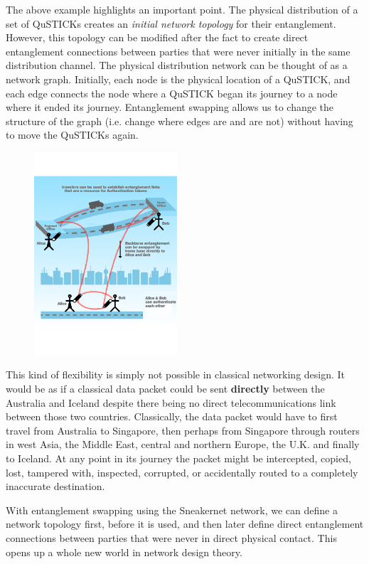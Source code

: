 \documentclass[twocolumn, aps, rmp, amsmath, amssymb, nofootinbib, superscriptaddress, longbibliography, floatfix, table-of-contents, eqsecnum]{revtex4-2}
\begin{document}
The above example highlights an important point. The physical distribution of a set of QuSTICKs creates an \textit{initial network topology} for their entanglement. However, this topology can be modified after the fact to create direct entanglement connections between parties that were never initially in the same distribution channel. The physical distribution network can be thought of as a network graph. Initially, each node is the physical location of a QuSTICK, and each edge connects the node where a QuSTICK began its journey to a node where it ended its journey. Entanglement swapping allows us to change the structure of the graph (i.e. change where edges are and are not) without having to move the QuSTICKs again. 
 
\begin{figure}[htbp!]
	\includegraphics[clip=true, width=0.475\textwidth]{SWAPPING}
	\caption{} \label{fig:SWAPPING}
\end{figure}

This kind of flexibility is simply not possible in classical networking design. It would be as if a classical data packet could be sent \textbf{directly} between the Australia and Iceland despite there being no direct telecommunications link between those two countries. Classically, the data packet would have to first travel from Australia to Singapore, then perhaps from Singapore through routers in west Asia, the Middle East, central and northern Europe, the U.K. and finally to Iceland. At any point in its journey the packet might be intercepted, copied, lost, tampered with, inspected, corrupted, or accidentally routed to a completely inaccurate destination. 

With entanglement swapping using the Sneakernet network, we can define a network topology first, before it is used, and then later define direct entanglement connections between parties that were never in direct physical contact. This opens up a whole new world in network design theory. 
\end{document}
